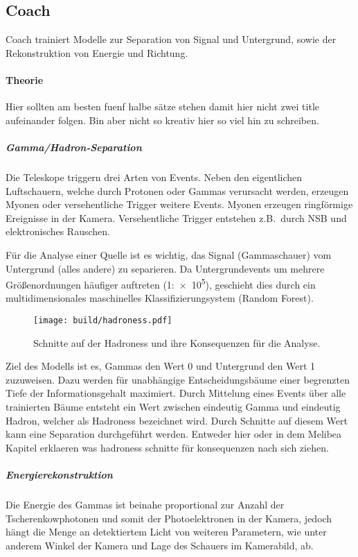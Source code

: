 \subsection{Coach}%
\label{sub:coach}

Coach trainiert Modelle zur Separation von Signal und Untergrund,
sowie der Rekonstruktion von Energie und Richtung.

\paragraph{Theorie}%
{\color{red}Hier sollten am besten fuenf halbe sätze stehen damit hier nicht zwei title aufeinander
folgen. Bin aber nicht so kreativ hier so viel hin zu schreiben.}

\subparagraph{Gamma/Hadron-Separation}
Die Teleskope triggern drei Arten von Events.
Neben den eigentlichen Luftschauern,
welche durch Protonen
oder Gammas verursacht werden,
erzeugen Myonen oder versehentliche Trigger weitere Events.
Myonen erzeugen ringförmige Ereignisse in der Kamera.
Versehentliche Trigger entstehen z.B.\ durch NSB und elektronisches Rauschen.

Für die Analyse einer Quelle ist es wichtig,
das Signal (Gammaschauer) vom
Untergrund (alles andere) zu separieren.
Da Untergrundevents um mehrere Größenordnungen häufiger auftreten (1:\num{e5}),
geschieht dies durch ein multidimensionales maschinelles
Klassifizierungsystem (Random Forest).

\begin{wrapfigure}[18]{L}{0.6\textwidth}
  \centering
  \texttt{[image: build/hadroness.pdf]}
  \caption{Schnitte auf der Hadroness und ihre Konsequenzen für die Analyse.}%
  \label{fig:uebersicht}
\end{wrapfigure}

Ziel des Modells ist es, Gammas den Wert 0 und Untergrund den Wert 1 zuzuweisen.
Dazu werden für unabhängige Entscheidungsbäume einer begrenzten Tiefe
der Informationsgehalt maximiert.
Durch Mittelung eines Events über alle trainierten Bäume entsteht ein Wert
zwischen eindeutig Gamma und eindeutig Hadron, welcher als Hadroness bezeichnet
wird.
Durch Schnitte auf diesem Wert kann eine Separation durchgeführt werden.
{\color{red}
  Entweder hier oder in dem Melibea Kapitel erklaeren was hadroness schnitte für
  konsequenzen nach sich ziehen.
}

\subparagraph{Energierekonstruktion}%
\label{par:energie}

Die Energie des Gammas ist beinahe proportional
zur Anzahl der Tscherenkowphotonen
und somit der Photoelektronen in der Kamera,
jedoch hängt die Menge an detektiertem Licht von weiteren Parametern,
wie unter anderem Winkel der Kamera und Lage des Schauers im Kamerabild, ab.

